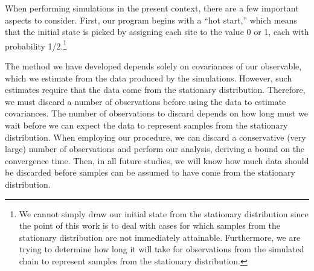 \documentclass[12pt,letterpaper]{report}
\theoremstyle{plain}
\theoremstyle{definition}
\theoremstyle{remark}
\numberwithin{theorem}{chapter}
\numberwithin{claim}{chapter}
\numberwithin{equation}{chapter}
\numberwithin{conjecture}{chapter}
\newcommand\<{\ensuremath{\langle}}
\renewcommand\>{\ensuremath{\rangle}}
\begin{document}
When performing simulations in the present context, there are a few important
aspects to consider. First, our program begins with a ``hot start,'' which means
that the initial state is picked by assigning each site to the value 0 or 1, each
with probability 1/2.\footnote{We cannot simply draw our initial state
from the stationary distribution since the point of this work
is to deal with cases for which samples from the stationary distribution are not
immediately attainable. Furthermore, we are trying to determine how long it will
take for observations from the simulated chain to represent samples from the
stationary distribution.}
%
%
%
%


The method we have developed depends solely on covariances
of our observable, which we estimate from the data produced by the
simulations. However, such estimates require that the data come from the
stationary distribution. Therefore, we must discard a number of observations
before using the data to estimate covariances. The number of observations 
to discard depends on how long must we wait 
before we can expect the data to represent samples from the stationary distribution.
When employing our procedure, we can discard a
conservative (very large) number of observations and perform our analysis, deriving a bound on
the convergence time. Then, in all future studies, we will know how much data should be discarded
before samples can be assumed to have come from the stationary distribution.
\end{document}
